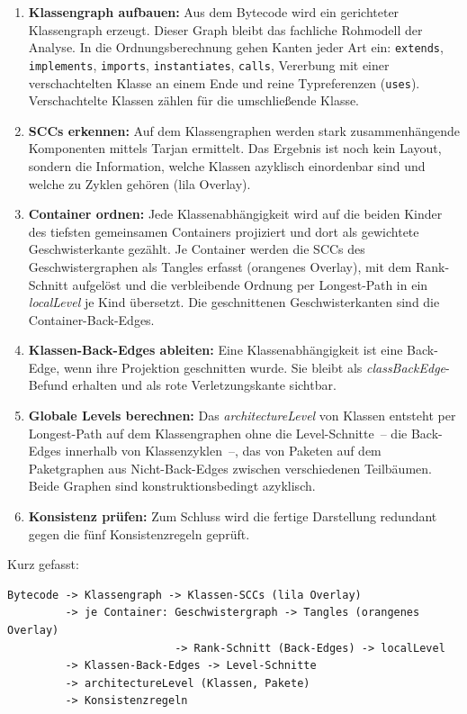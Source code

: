 \documentclass[a4paper,11pt]{article}
\begin{document}
\begin{enumerate}
  \item \textbf{Klassengraph aufbauen:} Aus dem Bytecode wird ein gerichteter
        Klassengraph erzeugt. Dieser Graph bleibt das fachliche Rohmodell der
        Analyse. In die Ordnungsberechnung gehen Kanten jeder Art ein:
        \texttt{extends}, \texttt{implements}, \texttt{imports},
        \texttt{instantiates}, \texttt{calls}, Vererbung mit einer
        verschachtelten Klasse an einem Ende und reine Typreferenzen
        (\texttt{uses}). Verschachtelte Klassen z\"ahlen f\"ur die
        umschlie\ss{}ende Klasse.
  \item \textbf{SCCs erkennen:} Auf dem Klassengraphen werden stark
        zusammenh\"angende Komponenten mittels Tarjan ermittelt. Das Ergebnis
        ist noch kein Layout, sondern die Information, welche Klassen azyklisch
        einordenbar sind und welche zu Zyklen geh\"oren (lila Overlay).
  \item \textbf{Container ordnen:} Jede Klassenabh\"angigkeit wird auf die
        beiden Kinder des tiefsten gemeinsamen Containers projiziert und dort
        als gewichtete Geschwisterkante gez\"ahlt. Je Container werden die SCCs
        des Geschwistergraphen als Tangles erfasst (orangenes Overlay), mit dem
        Rank-Schnitt aufgel\"ost und die verbleibende Ordnung per Longest-Path
        in ein \emph{localLevel} je Kind \"ubersetzt. Die geschnittenen
        Geschwisterkanten sind die Container-Back-Edges.
  \item \textbf{Klassen-Back-Edges ableiten:} Eine Klassenabh\"angigkeit ist
        eine Back-Edge, wenn ihre Projektion geschnitten wurde. Sie bleibt als
        \emph{classBackEdge}-Befund erhalten und als rote
        Verletzungskante sichtbar.
  \item \textbf{Globale Levels berechnen:} Das \emph{architectureLevel}
        von Klassen entsteht per Longest-Path auf dem Klassengraphen ohne die
        Level-Schnitte~-- die Back-Edges innerhalb von Klassenzyklen~--, das
        von Paketen auf dem Paketgraphen aus Nicht-Back-Edges zwischen
        verschiedenen Teilb\"aumen. Beide Graphen sind konstruktionsbedingt
        azyklisch.
  \item \textbf{Konsistenz pr\"ufen:} Zum Schluss wird die fertige Darstellung
        redundant gegen die f\"unf Konsistenzregeln gepr\"uft.
\end{enumerate}

Kurz gefasst:

\begin{lstlisting}
Bytecode -> Klassengraph -> Klassen-SCCs (lila Overlay)
         -> je Container: Geschwistergraph -> Tangles (orangenes Overlay)
                          -> Rank-Schnitt (Back-Edges) -> localLevel
         -> Klassen-Back-Edges -> Level-Schnitte
         -> architectureLevel (Klassen, Pakete)
         -> Konsistenzregeln
\end{lstlisting}
\end{document}
